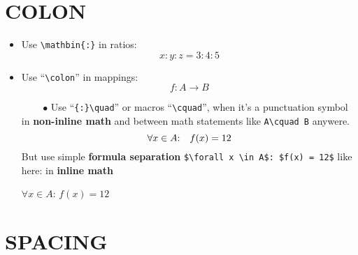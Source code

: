 \documentclass[a5paper,openany,9pt]{extbook}
\begin{document}
\section{COLON}

\begin{itemize}
\item
Use \verb|\mathbin{:}| in ratios:
$$x\mathbin{:}y\mathbin{:}z = 3\mathbin{:}4\mathbin{:}5$$

\item
Use ``\verb=\colon='' in mappings:
$$f\colon A \to B$$

\item[\colorbox{prpl}{\textcolor{white}{MY}}\ $\bullet$]
Use ``\verb={:}\quad='' or macros ``\verb=\cquad='', when it's a punctuation symbol in \textbf{non-inline math} and between math statements like \verb|A\cquad B| anywere.
$$\forall x \in A{:}\quad f(x) = 12$$
But use simple \textbf{formula separation} \verb|$\forall x \in A$: $f(x) = 12$| like here: in \textbf{inline math}
\begin{center}
$\forall x \in A$: $f(x) = 12$
\end{center}


\end{itemize}
	
\section{SPACING}
\end{document}
